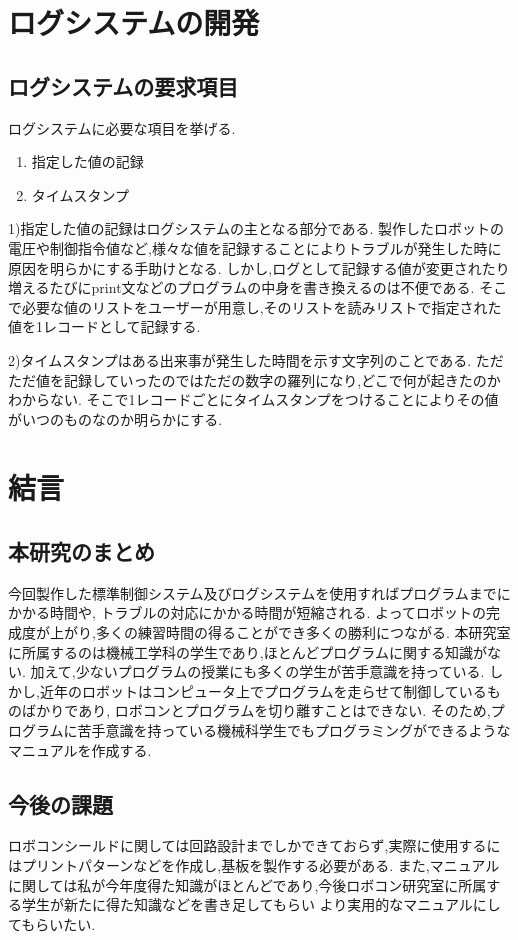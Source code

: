 \documentclass[12pt,oneside]{paper}
\begin{document}
\chapter{ログシステムの開発}
\section{ログシステムの要求項目}
ログシステムに必要な項目を挙げる.
\begin{enumerate}
 \item 指定した値の記録
 \item タイムスタンプ
\end{enumerate}
1)指定した値の記録はログシステムの主となる部分である.
製作したロボットの電圧や制御指令値など,様々な値を記録することによりトラブルが発生した時に原因を明らかにする手助けとなる.
しかし,ログとして記録する値が変更されたり増えるたびにprint文などのプログラムの中身を書き換えるのは不便である.
そこで必要な値のリストをユーザーが用意し,そのリストを読みリストで指定された値を1レコードとして記録する.


2)タイムスタンプはある出来事が発生した時間を示す文字列のことである.
ただただ値を記録していったのではただの数字の羅列になり,どこで何が起きたのかわからない.
そこで1レコードごとにタイムスタンプをつけることによりその値がいつのものなのか明らかにする.



\chapter{結言}
\section{本研究のまとめ}
今回製作した標準制御システム及びログシステムを使用すればプログラムまでにかかる時間や,
トラブルの対応にかかる時間が短縮される.
よってロボットの完成度が上がり,多くの練習時間の得ることができ多くの勝利につながる.
本研究室に所属するのは機械工学科の学生であり,ほとんどプログラムに関する知識がない.
加えて,少ないプログラムの授業にも多くの学生が苦手意識を持っている.
しかし,近年のロボットはコンピュータ上でプログラムを走らせて制御しているものばかりであり,
ロボコンとプログラムを切り離すことはできない.
そのため,プログラムに苦手意識を持っている機械科学生でもプログラミングができるようなマニュアルを作成する.


\section{今後の課題}
ロボコンシールドに関しては回路設計までしかできておらず,実際に使用するにはプリントパターンなどを作成し,基板を製作する必要がある.
また,マニュアルに関しては私が今年度得た知識がほとんどであり,今後ロボコン研究室に所属する学生が新たに得た知識などを書き足してもらい
より実用的なマニュアルにしてもらいたい.
\end{document}
